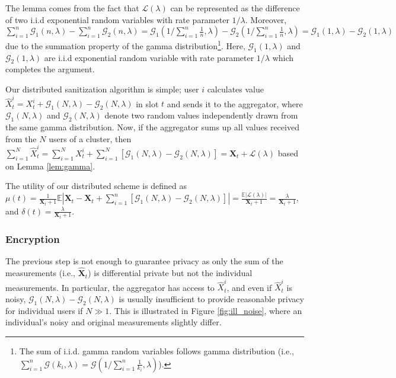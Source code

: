 \documentclass[11pt,a4paper]{article}
\theoremstyle{plain}
\theoremstyle{plain}
\theoremstyle{plain}
\theoremstyle{plain}
\theoremstyle{nonumberplain} \theoremseparator{}
\begin{document}
The lemma comes from the fact that $\mathcal{L}(\lambda)$ can be represented as the difference of two i.i.d exponential random variables with rate parameter $1/\lambda$. Moreover, $\sum_{i=1}^{n} \mathcal{G}_{1}(n, \lambda) - \sum_{i=1}^{n} \mathcal{G}_{2}(n, \lambda) = \mathcal{G}_{1}(1/\sum_{i=1}^{n}\frac{1}{n}, \lambda) - \mathcal{G}_{2}(1/\sum_{i=1}^{n}\frac{1}{n}, \lambda)= \mathcal{G}_{1}(1, \lambda) - \mathcal{G}_{2}(1, \lambda)$ due to the summation property of the gamma distribution\footnote{The sum of i.i.d. gamma random variables follows gamma distribution (i.e., $\sum_{i=1}^{n} \mathcal{G}(k_{i}, \lambda) = \mathcal{G}(1/\sum_{i=1}^{n}\frac{1}{k_{i}}, \lambda)$).}. Here, $\mathcal{G}_{1}(1, \lambda)$ and $\mathcal{G}_{2}(1, \lambda)$ are i.i.d exponential random variable with rate parameter $1/\lambda$ which completes the argument. 

Our distributed sanitization algorithm is simple; user $i$ calculates value $\hat{X}_{t}^{i} = X_{t}^{i} + \mathcal{G}_{1}(N, \lambda) - \mathcal{G}_{2}(N, \lambda)$ in slot $t$ and sends it to the aggregator, where $\mathcal{G}_{1}(N, \lambda)$ and $\mathcal{G}_{2}(N, \lambda)$ denote two random values independently drawn from the same gamma distribution. Now, if the aggregator sums up all values received
from the $N$ users of a cluster, then $\sum_{i=1}^{N} \hat{X}_{t}^{i} = \sum_{i=1}^{N} X_{t}^{i} + \sum_{i=1}^{N} [\mathcal{G}_{1}(N, \lambda) - \mathcal{G}_{2}(N, \lambda)] = \mathbf{X}_{t} + \mathcal{L}(\lambda)$ based on Lemma \ref{lem:gamma}.  

The utility of our distributed scheme is defined as $\mu(t) = \frac{1}{\mathbf{X}_{t}+1}\mathbb{E}|\mathbf{X}_{t} - \mathbf{X}_{t} + \sum_{i=1}^{n} [\mathcal{G}_{1}(N, \lambda) - \mathcal{G}_{2}(N, \lambda)]| = \frac{\mathbb{E}|\mathcal{L}(\lambda)|}{\mathbf{X}_{t}+1} =  \frac{\lambda}{\mathbf{X}_{t}+1}$, and $\delta(t) = \frac{\lambda}{\mathbf{X}_{t}+1}$.

\subsubsection{Encryption} 
\label{sec:enc}

The previous step is not enough to guarantee
privacy as only the sum of the measurements (i.e., $\hat{\mathbf{X}}_{t}$) is differential private
but not the individual measurements. In particular, the aggregator has access to $\hat{X}_{t}^{i}$, 
and even if $\hat{X}_{t}^{i}$ is noisy, $\mathcal{G}_{1}(N, \lambda) - \mathcal{G}_{2}(N, \lambda)$ is
usually insufficient to provide reasonable privacy for individual users if $N \gg 1$. This is illustrated in Figure \ref{fig:ill_noise}, where an individual's noisy and original measurements slightly differ.
\end{document}

